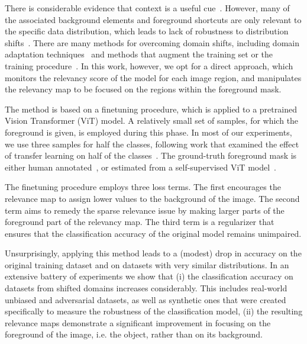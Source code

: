 \documentclass{article}
\begin{document}
There is considerable evidence that context is a useful cue~\cite{lapuschkin2019unmasking, rosenfeld2018elephant}. However, many of the associated background elements and foreground shortcuts are only relevant to the specific data distribution, which leads to lack of robustness to distribution shifts~\cite{nguyen2014deep,shetty2019not}. There are many methods for overcoming domain shifts, including domain adaptation techniques~\cite{ganin2016domain,arjovsky2020invariant} and methods that augment the training set or the training procedure~\cite{ilyas2019adversarial,nuriel2021permuted}. In this work, however, we opt for a direct approach, which monitors the relevancy score of the model for each image region, and manipulates the relevancy map to be focused on the regions within the foreground mask.

The method is based on a finetuning procedure, which is applied to a pretrained Vision Transformer (ViT) model. A relatively small set of samples, for which the foreground is given, is employed during this phase. In most of our experiments, we use three samples for half the classes, following work that examined the effect of transfer learning on half of the classes~\cite{yosinski2014transferable}. The ground-truth foreground mask is either human annotated~\cite{gao2021luss}, or estimated from a self-supervised ViT model~\cite{wang2022tokencut}. 


The finetuning procedure employs three loss terms. The first encourages the relevance map to assign lower values to the background of the image. The second term aims to remedy the sparse relevance issue by making larger parts of the foreground part of the relevancy map. The third term is a regularizer that ensures that the classification accuracy of the original model remains unimpaired.

Unsurprisingly, applying this method leads to a (modest) drop in accuracy on the original training dataset and on datasets with very similar distributions. 
In an extensive battery of experiments we show that (i)  the classification accuracy on datasets from shifted domains increases considerably. This includes real-world unbiased and adversarial datasets, as well as synthetic ones that were created specifically to measure the robustness of the classification model, (ii) the resulting relevance maps demonstrate a significant improvement in focusing on the foreground of the image, i.e. the object, rather than on its background. 
\end{document}

